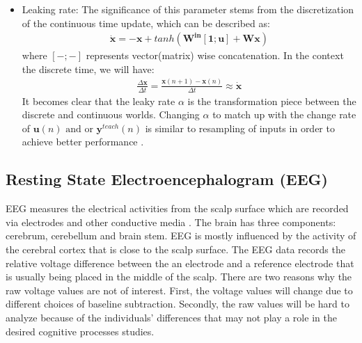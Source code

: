 \documentclass[a4paper,11pt,oneside]{article}
\begin{document}
\begin{itemize}
 	 \item Leaking rate: The significance of this parameter stems from the discretization of the continuous time update, which can be described as:
 	 \begin{align}
 	 \dot{\mathbf{x}} = -\mathbf{x} + tanh(\mathbf{W^{in}[1; u] + Wx})
 	 \end{align}
 	 where $[-;-]$ represents vector(matrix) wise concatenation. In the context the discrete time, we will have:
 	 \begin{align}
 	 \frac{\Delta\mathbf{x}}{\Delta t} = \frac{\mathbf{x}(n+1) - \mathbf{x}(n)}{\Delta t} \approx \dot{\mathbf{x}} 
 	 \end{align}
 	 It becomes clear that the leaky rate $\alpha$ is the transformation piece between the discrete and continuous worlds. Changing $\alpha$ to match up with the change rate of $\mathbf{u}(n) \text{ and or } \mathbf{y}^{teach}(n)$ is similar to resampling of inputs in order to achieve better performance \cite{schrauwen2007introduction}. 
 	 
 \end{itemize}


\subsection{Resting State Electroencephalogram (EEG)}
EEG measures the electrical activities from the scalp surface which are recorded via electrodes and other conductive media \cite{niedermeyer2005electroencephalography}. The brain has three components: cerebrum, cerebellum and brain stem. EEG is mostly influenced by the activity of the cerebral cortex that is close to the scalp surface. The EEG data records the relative voltage difference between the an electrode and a reference electrode that is usually  being placed in the middle of the scalp. There are two reasons why the raw voltage values are not of interest. First, the voltage values will change due to different choices of baseline subtraction. Secondly, the raw values will be hard to analyze because of the individuals' differences that may not play a role in the desired cognitive processes studies. \cite{cohen2014analyzing}
\end{document}
